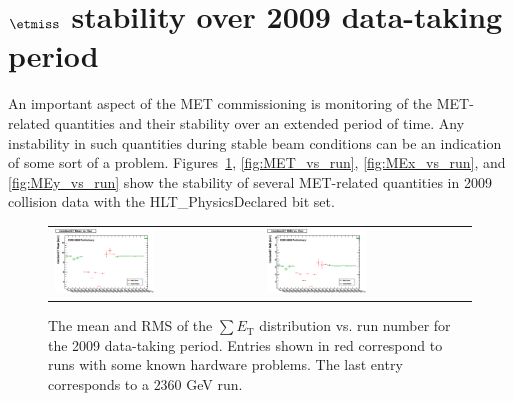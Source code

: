 \section{$\etmiss$ stability over 2009 data-taking period}
\label{sc:METStab}

An important aspect of the MET commissioning is monitoring of the MET-related quantities and their stability over
an extended period of time. Any instability in such quantities during stable beam conditions can be an indication of some sort of a problem.
Figures~\ref{fig:SumET_vs_run}, \ref{fig:MET_vs_run}, \ref{fig:MEx_vs_run}, and \ref{fig:MEy_vs_run} show the stability of several MET-related
quantities in 2009 collision data with the HLT\_PhysicsDeclared bit set.

\begin{figure}[h!]
 \centering
 \begin{tabular}{ll}
  \includegraphics[width=0.5\textwidth]{plots_METStability/h_caloSumetMean_vs_run.eps} &
  \includegraphics[width=0.5\textwidth]{plots_METStability/h_caloSumetRMS_vs_run.eps} \\
 \end{tabular}
 \caption{\small The mean and RMS of the $\sum E_\text{T}$ distribution vs. run number for the 2009 data-taking period.
          Entries shown in red correspond to runs with some known hardware problems. The last entry corresponds to a $2360$ GeV run.
          \label{fig:SumET_vs_run}}
\end{figure}

